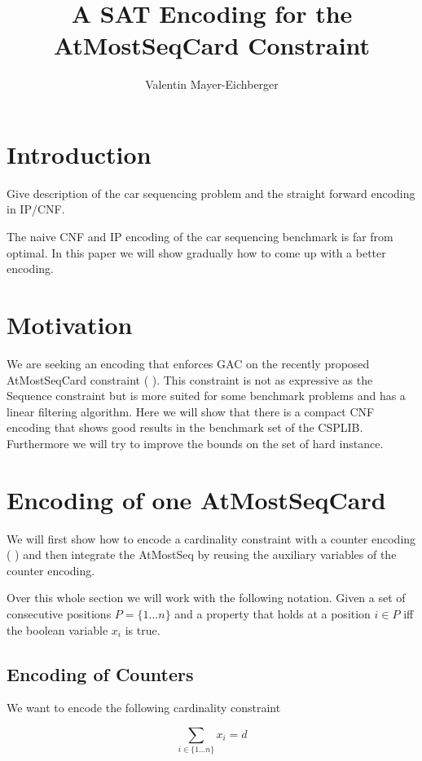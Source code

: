 \documentclass[]{llncs}
\author{Valentin Mayer-Eichberger}
\institute{NICTA \\ University of New South Wales \\
\email{valentin.mayer-eichberger@nicta.com.au}}
\title{A SAT Encoding for the AtMostSeqCard Constraint}
\newcommand{\TODO}[1]{ {\color{red}{#1} }}
\begin{document}
 \maketitle

\section{Introduction}

Give description of the car sequencing problem and the straight
forward encoding in IP/CNF. 

The naive CNF and IP encoding of the car sequencing benchmark is
far from optimal. In this paper we will show gradually how to come up
with a better encoding. 

\section{Motivation}

We are seeking an encoding that enforces GAC on the recently proposed
AtMostSeqCard constraint (\TODO{ref}). This constraint is not as expressive as the
Sequence constraint but is more suited for some benchmark problems and
has a linear filtering algorithm. Here we will show that there is a
compact CNF encoding that shows good results in the benchmark set of the
CSPLIB. Furthermore we will try to improve the bounds on the set of hard
instance. 

\section{Encoding of one AtMostSeqCard}

We will first show how to encode a cardinality constraint with a counter
encoding (\TODO{ref}) and then integrate the AtMostSeq by reusing the auxiliary
variables of the counter encoding. 

Over this whole section we will work with the following notation. Given
a set of consecutive positions $P=\{1\ldots n\}$ and a property that
holds at a position $i\in P$ iff the boolean variable $x_i$ is true. 

\subsection{Encoding of Counters}

We want to encode the following cardinality constraint

$$ \sum_{i\in \{1\ldots n\}} x_{i} = d $$
\end{document}
